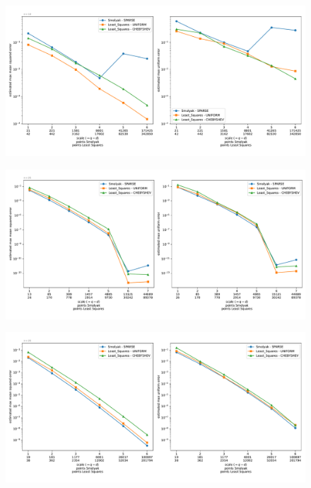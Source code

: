 \documentclass[12pt, oneside]{amsart}
\theoremstyle{definition}
\theoremstyle{remark}
\numberwithin{equation}{section}
\begin{document}
\begin{figure}[h]
	\centering
	\includegraphics[width=\linewidth]{figures/morokoff_calfisch1/dim10/max_error_distribution_fixed_dim}
	\caption{}
	\label{fig:morokoff_calfisch1_dim10}
\end{figure}


\begin{figure}[h]
	\centering
	\includegraphics[width=\linewidth]{figures/morokoff_calfisch2/dim6/max_error_distribution_fixed_dim}
	\caption{}
	\label{fig:morokoff_calfisch2_dim6}
\end{figure}

\begin{figure}[h]
	\centering
	\includegraphics[width=\linewidth]{figures/morokoff_calfisch2/dim9/max_error_distribution_fixed_dim}
	\caption{}
	\label{fig:morokoff_calfisch2_dim9}
\end{figure}
\end{document}

